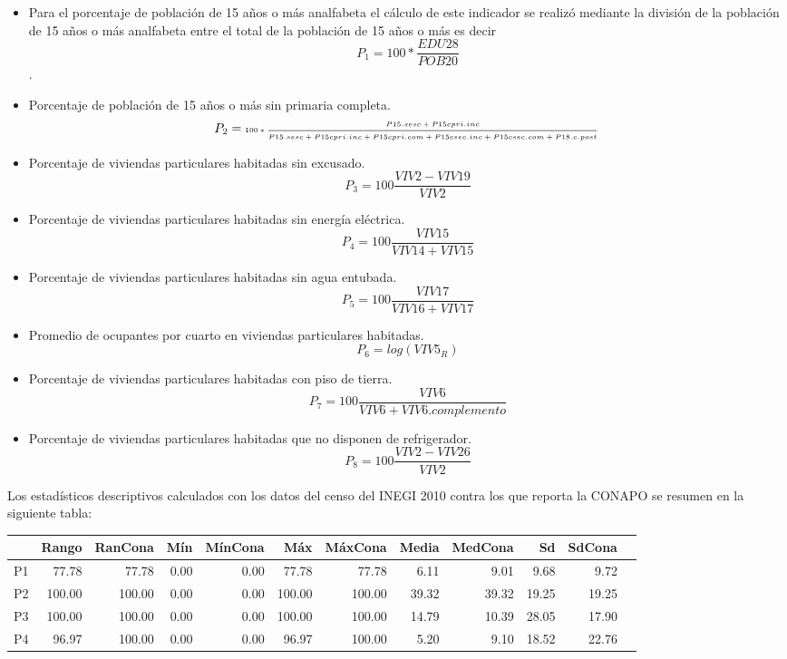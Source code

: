 \documentclass[paper=letter, fontsize=11pt]{scrartcl}
\numberwithin{equation}{section} %
\numberwithin{figure}{section} %
\numberwithin{table}{section} %
\begin{document}
\begin{enumerate}
\begin{enumerate}
\begin{itemize}
\item Para el porcentaje de población de 15 años o más analfabeta el cálculo de este indicador se realizó mediante la división de la población de 15 años o más analfabeta entre el total de la población de 15 años o más es decir \\
\[P_1 = 100*\frac{EDU28}{POB20}
\].
\item Porcentaje de población de 15 años o más sin primaria completa. 
\[ 
P_2 = \text{\tiny{\( 100*\frac{P15.sesc + P15cpri.inc}{
            P15.sesc + P15cpri.inc + 
               P15cpri.com	+ P15csec.inc +
               P15csec.com + P18.c.post} \)} } \]    

\item Porcentaje de viviendas particulares habitadas sin excusado. 
\[
P_3 = 100\frac{VIV2-VIV19}{VIV2}
\]
\item Porcentaje de viviendas particulares habitadas sin energía eléctrica. 
\[
P_4 = 100\frac{VIV15}{VIV14+VIV15}
\]
\item Porcentaje de viviendas particulares habitadas sin agua entubada. 
\[
P_5 = 100\frac{VIV17}{VIV16+VIV17}
\]
\item Promedio de ocupantes por cuarto en viviendas particulares habitadas.
\[
P_6 = log(VIV5_R)
\]
\item Porcentaje de viviendas particulares habitadas con piso de tierra. 
\[
P_7 = 100\frac{VIV6}{VIV6 + VIV6.complemento}
\]
\item Porcentaje de viviendas particulares habitadas que no disponen de refrigerador.
\[
P_8 = 100\frac{VIV2-VIV26}{VIV2}
\]
\end{itemize}
Los estadísticos descriptivos calculados con los datos del censo del INEGI 2010 contra los que reporta la CONAPO se resumen en la siguiente tabla:
\begin{table}[ht]
\centering
\begin{tabular}{rrrrrrrrrrrl}
  \hline
 & Rango & RanCona & Mín & MínCona & Máx & MáxCona & Media & MedCona & Sd & SdCona  \\ 
  \hline
P1 & 77.78 & 77.78 & 0.00 & 0.00 & 77.78 & 77.78 & 6.11 & 9.01 & 9.68 & 9.72  \\ 
  P2 & 100.00 & 100.00 & 0.00 & 0.00 & 100.00 & 100.00 & 39.32 & 39.32 & 19.25 & 19.25 \\ 
  P3 & 100.00 & 100.00 & 0.00 & 0.00 & 100.00 & 100.00 & 14.79 & 10.39 & 28.05 & 17.90 \\ 
  P4 & 96.97 & 100.00 & 0.00 & 0.00 & 96.97 & 100.00 & 5.20 & 9.10 & 18.52 & 22.76  \\ 

\end{tabular}
\end{table}
\end{enumerate}
\end{enumerate}
\end{document}
